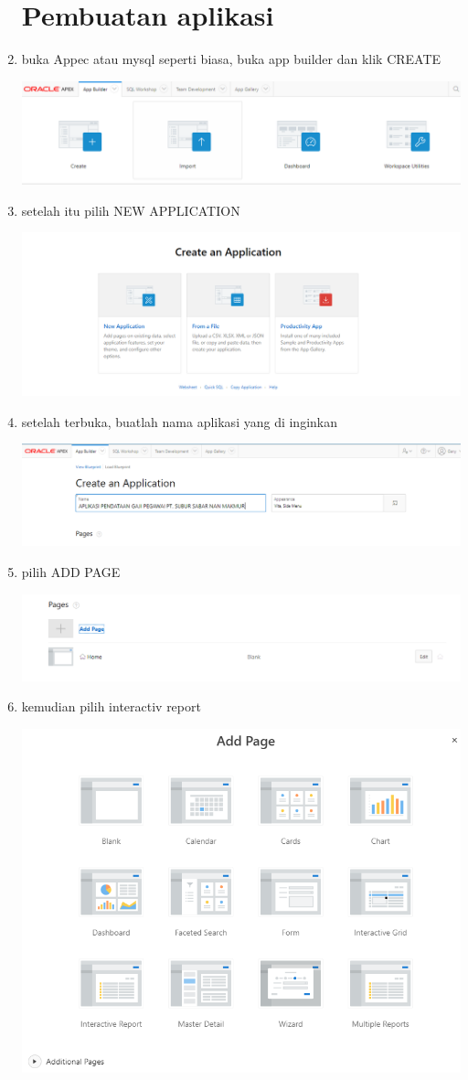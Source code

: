\documentclass{article}
\begin{document}
\begin{enumerate}
\section{Pembuatan aplikasi}
    \item buka Appec atau mysql seperti biasa, buka app builder dan klik CREATE
    \begin{center}
    \includegraphics[width=.6\textwidth]{gambar/1.PNG}
    \end{center}
    \item setelah itu pilih NEW APPLICATION
    \begin{center}
    \includegraphics[width=.6\textwidth]{gambar/2.PNG}
    \end{center}
    \item setelah terbuka, buatlah nama aplikasi yang di inginkan
    \begin{center}
    \includegraphics[width=.6\textwidth]{gambar/3.PNG}
    \end{center}
    \item pilih ADD PAGE
    \begin{center}
    \includegraphics[width=.6\textwidth]{gambar/4.PNG}
    \end{center}
    \item kemudian pilih interactiv report
    \begin{center}
    \includegraphics[width=.6\textwidth]{gambar/5.PNG}

\end{center}
\end{enumerate}
\end{document}
